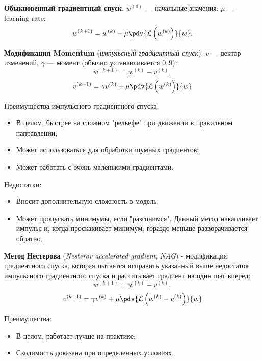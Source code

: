 \begin{definition}
    \textbf{Обыкновенный градиентный спуск}. $w^{(0)}$ --- начальные значения, $\mu$ --- learning rate:
    \[
        w^{(k+1)}=w^{(k)}-\mu\pdv{\mathcal{L}\left(w^{(k)}\right)}{w}.
    \]
\end{definition}

\begin{definition}
    \textbf{Модификация Momentum} (\textit{импульсный градиентный спуск}). $v$ --- вектор изменений, $\gamma$ --- момент (обычно устанавливается $0,9$):
    \[
        w^{(k+1)}=w^{(k)}-v^{(k)},
    \]
    \[
        v^{(k+1)}=\gamma v^{(k)}+\mu\pdv{\mathcal{L}\left(w^{(k)}\right)}{w}
    \]
\end{definition}

Преимущества импульсного градиентного спуска:
\begin{itemize}
    \item В целом, быстрее на сложном "рельефе" при движении в правильном направлении;
    \item Может использоваться для обработки шумных градиентов;
    \item Может работать с очень маленькими градиентами.
\end{itemize}

Недостатки:
\begin{itemize}
    \item Вносит дополнительную сложность в модель;
    \item Может пропускать минимумы, если "разгонимся". Данный метод накапливает импульс и, когда проскакивает минимум, гораздо меньше разворачивается обратно.
\end{itemize}

\begin{definition}
    \textbf{Метод Нестерова} (\textit{Nesterov accelerated gradient}, \textit{NAG}) - модификация градиентного спуска, которая пытается исправить указанный выше недостаток импульсного градиентного спуска и расчитывает градиент на один шаг вперед:
    \[
        w^{(k+1)}=w^{(k)}-v^{(k)},
    \]
    \[
        v^{(k+1)}=\gamma v^{(k)}+\mu\pdv{\mathcal{L}\left(w^{(k)}-v^{(k)}\right)}{w}
    \]
\end{definition}

Преимущества:
\begin{itemize}
    \item В целом, работает лучше на практике;
    \item Сходимость доказана при определенных условиях.
\end{itemize}

